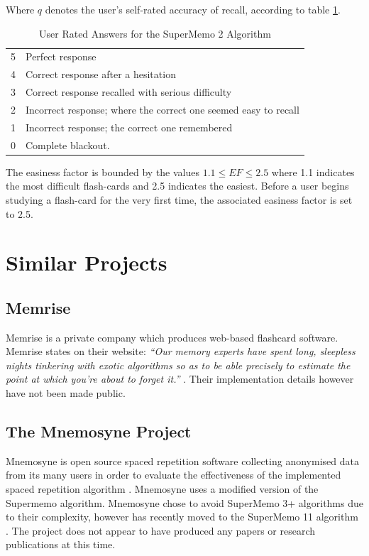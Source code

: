Where $q$ denotes the user's self-rated accuracy of recall, according to table \ref{tbl_sm2ratings}.
\begin{table}[h!]
\caption{User Rated Answers for the SuperMemo 2 Algorithm \cite{wozniak_optimization_1990}}
\label{tbl_sm2ratings}
\begin{tabular}{|c|l|}
\hline
5 & Perfect response \\
4 & Correct response after a hesitation \\
3 & Correct response recalled with serious difficulty \\
\hline
2 & Incorrect response; where the correct one seemed easy to recall \\
1 & Incorrect response; the correct one remembered \\
0 & Complete blackout. \\
\hline
\end{tabular}
\end{table}

The easiness factor is bounded by the values $1.1 \leq EF \leq 2.5$ where 1.1 indicates
the most difficult flash-cards and 2.5 indicates the easiest. Before a user begins studying a
flash-card for the very first time, the associated easiness factor is set to 2.5.

\section{Similar Projects} \label{background_similarprojects}
\subsection*{Memrise}
Memrise is a private company which produces web-based flashcard software. Memrise states
on their website: \textit{``Our memory experts have spent long, sleepless nights
tinkering with exotic algorithms so as to be able precisely to estimate the
point at which you're about to forget it.''} \cite{memrise_website}. Their implementation
details however have not been made public.

\subsection*{The Mnemosyne Project}
Mnemosyne is open source spaced repetition software collecting anonymised data from its many users in order
to evaluate the effectiveness of the implemented spaced repetition algorithm \cite{peter_bienstman_principles_2012}.
Mnemosyne uses a modified version of the Supermemo algorithm. Mnemosyne chose to avoid SuperMemo 3+ algorithms
due to their complexity, however has recently moved to the SuperMemo 11 algorithm \cite{peter_bienstman_principles_2012}.
The project does not appear to have produced any papers or research publications at this time.

